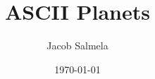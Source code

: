 \title{ASCII Planets}
\author{Jacob Salmela}
\date{\today}
\usepackage{extsizes}
\usepackage[a4paper, total={8.5in, 11in},margin=5mm,top=10mm,left=10mm,right=5mm]{geometry}
\usepackage{fontspec}
\usepackage{multicol}
\usepackage{listings}
\usepackage{multirow} %
\usepackage{tabularx}
\usepackage{hhline}
\usepackage{graphicx} %
\usepackage[table]{xcolor}
\usepackage{float}
\usepackage{pgffor}
